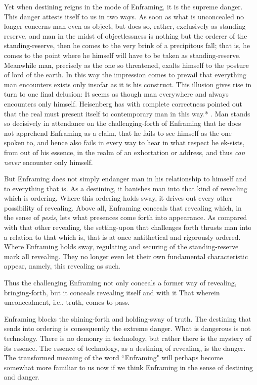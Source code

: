 Yet when destining reigns in the mode of Enframing, it is the supreme danger. This danger attests itself to us in two ways. As soon as what is unconcealed no longer concerns man even as object, but does so, rather, exclusively as standing-reserve, and man in the midst of objectlessness is nothing but the orderer of the standing-reserve, then he comes to the very brink of a precipitous fall; that is, he comes to the point where he himself will have to be taken as standing-reserve. Meanwhile man, precisely as the one so threatened, exalts himself to the posture of lord of the earth. In this way the impression comes to prevail that everything man encounters exists only insofar as it is his construct. This illusion gives rise in turn to one final delusion: It seems as though man everywhere and always encounters only himself. Heisenberg has with complete correctness pointed out that the real must present itself to contemporary man in this way.* . Man stands so decisively in attendance on the challenging-forth of Enframing that he does not apprehend Enframing as a claim, that he fails to see himself as the one spoken to, and hence also fails in every way to hear in what respect he ek-sists, from out of his essence, in the realm of an exhortation or address, and thus \textit{can never} encounter only himself.

But Enframing does not simply endanger man in his relationship to himself and to everything that is. As a destining, it banishes man into that kind of revealing which is ordering. Where this ordering holds sway, it drives out every other possibility of revealing. Above all, Enframing conceals that revealing which, in the sense of \textit{pesis}, lets what presences come forth into appearance. As compared with that other revealing, the setting-upon that challenges forth thrusts man into a relation to that which is, that is at once antithetical and rigorously ordered. Where Enframing holds sway, regulating and securing of the standing-reserve mark all revealing. They no longer even let their own fundamental characteristic appear, namely, this revealing as such.

Thus the challenging Enframing not only conceals a former way of revealing, bringing-forth, but it conceals revealing itself and with it That wherein unconcealment, i.e., truth, comes to pass.

Enframing blocks the shining-forth and holding-sway of truth. The destining that sends into ordering is consequently the extreme danger. What is dangerous is not technology. There is no demonry in technology, but rather there is the mystery of its essence. The essence of technology, as a destining of revealing, is the danger. The transformed meaning of the word ``Enframing" will perhaps become somewhat more familiar to us now if we think Enframing in the sense of destining and danger.

